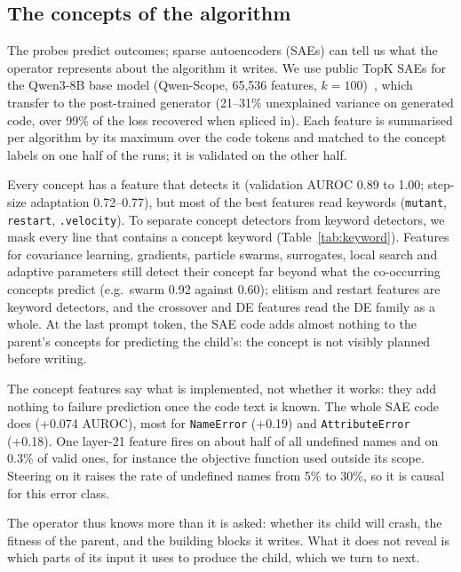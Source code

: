 \subsection{The concepts of the algorithm}\label{sec:concepts}
The probes predict outcomes; sparse autoencoders (SAEs) can tell us
what the operator represents about the algorithm it writes. We use public TopK SAEs
for the Qwen3-8B base model (Qwen-Scope, 65,536 features,
$k=100$)~\cite{qwenscope}, which transfer to the post-trained generator
(21--31\% unexplained variance on generated code, over 99\% of the loss
recovered when spliced in). Each feature is summarised per algorithm by
its maximum over the code tokens and matched to the concept labels on
one half of the runs; it is validated on the other half.

Every concept has a feature that detects it (validation AUROC 0.89 to
1.00; step-size adaptation 0.72--0.77), but most of the best features
read keywords (\texttt{mutant}, \texttt{restart}, \texttt{.velocity}). To
separate concept detectors from keyword detectors, we mask every line
that contains a concept keyword (Table~\ref{tab:keyword}). Features for
covariance learning, gradients, particle swarms, surrogates, local
search and adaptive parameters still detect their concept far beyond
what the co-occurring concepts predict (e.g.\ swarm 0.92 against 0.60);
elitism and restart features are keyword detectors, and the crossover
and DE features read the DE family as a whole. At the last prompt token,
the SAE code adds almost nothing to the parent's concepts for predicting
the child's: the concept is not visibly planned before writing.

The concept features say what is implemented, not whether it works:
they add nothing to failure prediction once the code text is known. The
whole SAE code does (+0.074 AUROC), most for \texttt{NameError} (+0.19)
and \texttt{AttributeError} (+0.18). One layer-21 feature fires on about
half of all undefined names and on 0.3\% of valid ones, for instance the
objective function used outside its scope. Steering on it raises the
rate of undefined names from 5\% to 30\%, so it is causal for this
error class.

The operator thus knows more than it is asked: whether its child will
crash, the fitness of the parent, and the building blocks it writes. What
it does not reveal is which parts of its input it uses to produce the
child, which we turn to next.
